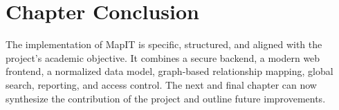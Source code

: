 \section{Chapter Conclusion}
The implementation of MapIT is specific, structured, and aligned with the project’s academic objective. It combines a secure backend, a modern web frontend, a normalized data model, graph-based relationship mapping, global search, reporting, and access control. The next and final chapter can now synthesize the contribution of the project and outline future improvements.
